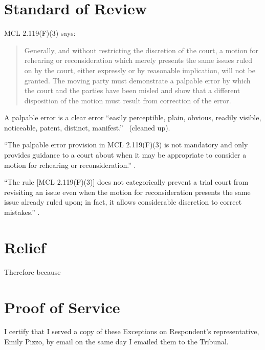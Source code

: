 \documentclass[12pt,\documentclassflag]{michiganCourtOfAppealsBrief}
\begin{document}
\section{Standard of Review}

MCL 2.119(F)(3) says:

\begin{quote}
  Generally, and without restricting the discretion of the court, a motion for rehearing or reconsideration which merely presents the same issues ruled on by the court, either expressly or by reasonable implication, will not be granted. The moving party must demonstrate a palpable error by which the court and the parties have been misled and show that a different disposition of the motion must result from correction of the error.
\end{quote}

 A palpable error is a clear error ``easily perceptible, plain, obvious, readily
 visible, noticeable, patent, distinct, manifest.'' \ (cleaned up).
 
``The palpable error provision in MCL 2.119(F)(3)  is not mandatory and only provides guidance to
a court about when it may be appropriate to consider a motion for rehearing or reconsideration.''
.

``The rule [MCL 2.119(F)(3)] does not categorically prevent a trial court from revisiting an issue even when the motion for reconsideration presents the same issue already ruled upon; in fact, it allows considerable discretion to correct mistakes.'' . 








\section{Relief}

Therefore because


\section{Proof of Service}

I certify that I served a copy of these Exceptions on Respondent's representative, Emily Pizzo, by email on the same day I emailed them to the Tribunal.

\vspace{1\baselineskip}
\end{document}
